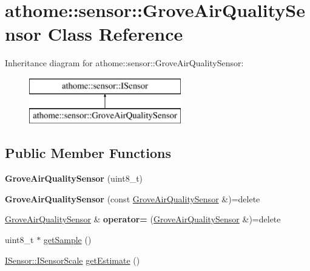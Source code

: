 \hypertarget{classathome_1_1sensor_1_1_grove_air_quality_sensor}{}\section{athome\+:\+:sensor\+:\+:Grove\+Air\+Quality\+Sensor Class Reference}
\label{classathome_1_1sensor_1_1_grove_air_quality_sensor}
Inheritance diagram for athome\+:\+:sensor\+:\+:Grove\+Air\+Quality\+Sensor\+:\begin{figure}[H]
\begin{center}
\leavevmode
\includegraphics[height=2.000000cm]{classathome_1_1sensor_1_1_grove_air_quality_sensor}
\end{center}
\end{figure}
\subsection*{Public Member Functions}
\begin{DoxyCompactItemize}
\item 
\mbox{\label{classathome_1_1sensor_1_1_grove_air_quality_sensor_aca536358e33c53897e580f5298d23d29}} 
{\bfseries Grove\+Air\+Quality\+Sensor} (uint8\+\_\+t)
\item 
\mbox{\label{classathome_1_1sensor_1_1_grove_air_quality_sensor_afe5df58934eb59b9feb6da3af56c63ef}} 
{\bfseries Grove\+Air\+Quality\+Sensor} (const \mbox{\hyperlink{classathome_1_1sensor_1_1_grove_air_quality_sensor}{Grove\+Air\+Quality\+Sensor}} \&)=delete
\item 
\mbox{\label{classathome_1_1sensor_1_1_grove_air_quality_sensor_aff70455579596e94914e656a2ac77072}} 
\mbox{\hyperlink{classathome_1_1sensor_1_1_grove_air_quality_sensor}{Grove\+Air\+Quality\+Sensor}} \& {\bfseries operator=} (\mbox{\hyperlink{classathome_1_1sensor_1_1_grove_air_quality_sensor}{Grove\+Air\+Quality\+Sensor}} \&)=delete
\item 
uint8\+\_\+t $\ast$ \mbox{\hyperlink{classathome_1_1sensor_1_1_grove_air_quality_sensor_aee12d8cf6439b752c868f75cae298182}{get\+Sample}} ()
\item 
\mbox{\hyperlink{classathome_1_1sensor_1_1_i_sensor_aa70bc27a4c17c86caf96cca776541ddf}{I\+Sensor\+::\+I\+Sensor\+Scale}} \mbox{\hyperlink{classathome_1_1sensor_1_1_grove_air_quality_sensor_a3eeec77eb0bbf3932cdfa9d33a708e57}{get\+Estimate}} ()
\end{DoxyCompactItemize}
